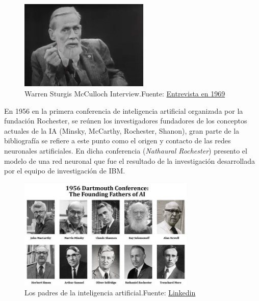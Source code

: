 \begin{figure}[H]
    \centering
    \includegraphics[width=0.55\textwidth]{figures/Warren Sturgis McCulloch Interview.png}
    \caption{Warren Sturgis McCulloch Interview.\newline{}Fuente: \href{https://www.youtube.com/watch?v=8Wdz1Tj5084}{Entrevista en 1969}}
    \label{fig:Warren Sturgis McCulloch}
\end{figure}


En 1956 en la primera conferencia de inteligencia artificial organizada por la fundación {Rochester}, se reúnen los investigadores fundadores de los conceptos actuales de la IA ({Minsky, McCarthy, Rochester, Shanon}), gran parte de la bibliografía se refiere a este punto como el origen y contacto de las redes neuronales artificiales.
En dicha conferencia (\textit{Nathaural Rochester}) presento el modelo de una red neuronal que fue el resultado de la investigación desarrollada por el equipo de investigación de IBM.

\begin{figure}[H]
    \centering
    \includegraphics[width=0.75\textwidth]{figures/conferecia 1956 - 1689170718524.png}
    \caption{Los padres de la inteligencia artificial.\newline{}Fuente: \href{https://www.linkedin.com/pulse/first-ever-ai-conference-tracing-evolution-history-ofai-nicky-verd}{Linkedin}}
    \label{fig:conferencia-1956}
\end{figure}

